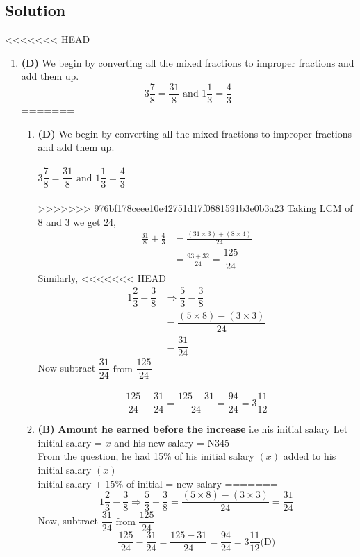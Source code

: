 \subsection{Solution}
\begin{multicols}{2}
<<<<<<< HEAD
\begin{enumerate}[label={\textbf{\arabic*.}}]
    \item \textbf{(D)} We begin by converting all the mixed fractions to improper fractions and add them up.
    \[3\dfrac{7}{8} = \dfrac{31}{8} \text { and } 1\dfrac{1}{3} = \dfrac{4}{3}\] 
=======
\begin{enumerate}[label={\arabic*.}]
    \item \textbf{(D)} We begin by converting all the mixed fractions to improper fractions and add them up.\\\\
    \(3\dfrac{7}{8} = \dfrac{31}{8} \text { and } 1\dfrac{1}{3} = \dfrac{4}{3}\) \\\\
>>>>>>> 976bf178ceee10e42751d17f0881591b3e0b3a23
    Taking LCM of \(8\) and \(3\) we get \(24\),
    \begin{align*}
    \frac{31}{8} + \frac{4}{3} &= \frac{(31 \times 3) + (8 \times 4) }{24} \\
    &= \frac{93 + 32}{24} = \dfrac{125}{24}
    \end{align*}
    Similarly, 
<<<<<<< HEAD
    \begin{align*}
    1\dfrac{2}{3} - \dfrac{3}{8} &\Rightarrow \dfrac{5}{3} - \dfrac{3}{8} \\ 
    &= \dfrac{(5 \times 8) - (3 \times 3)}{24} \\ &= \dfrac{31}{24}
    \end{align*}
    Now subtract  \(\dfrac{31}{24} \text { from } \dfrac{125}{24}\) \\\\
    \[\dfrac{125}{24} - \dfrac{31}{24} = \dfrac{125 - 31}{24} = \dfrac{94}{24} = 3\dfrac{11}{12} \]
    
    \item \textbf{(B)} \textbf{Amount he earned before the increase} i.e his initial salary
    Let initial salary = \(x\) and his new salary = N\(345\)\\
    From the question, he had 15\% of his initial salary $(x)$ added to his initial salary $(x)$ \\
    initial salary + $15\%$ of initial = new salary
=======
    \[1\frac{2}{3} - \frac{3}{8} \Rightarrow \frac{5}{3} - \frac{3}{8} = \frac{(5 \times 8) - (3 \times 3)}{24} = \frac{31}{24}\]
    Now, subtract \(\dfrac{31}{24} \text { from } \dfrac{125}{24}\)
    \[\frac{125}{24} - \frac{31}{24} = \frac{125 - 31}{24} = \frac{94}{24} = 3\frac{11}{12} \text{(D)} \]
    

\end{enumerate}
\end{enumerate}
\end{multicols}
